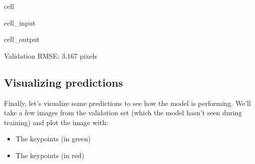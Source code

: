\documentclass[letterpaper,10pt,english]{jupyterBook}
\begin{document}
\begin{sphinxuseclass}{cell}
\begin{sphinxVerbatimInput}
\begin{sphinxuseclass}{cell_input}
\end{sphinxuseclass}\end{sphinxVerbatimInput}
\begin{sphinxVerbatimOutput}

\begin{sphinxuseclass}{cell_output}
\begin{sphinxVerbatim}[commandchars=\\\{\}]
Validation RMSE: 3.167 pixels
\end{sphinxVerbatim}

\end{sphinxuseclass}\end{sphinxVerbatimOutput}

\end{sphinxuseclass}

\subsection{Visualizing predictions}
\label{\detokenize{04:visualizing-predictions}}
\sphinxAtStartPar
Finally, let’s visualize some predictions to see how the model is performing. We’ll take a few images from the validation set (which the model hasn’t seen during training) and plot the image with:
\begin{itemize}
\item {} 
\sphinxAtStartPar
The  keypoints (in green)

\item {} 
\sphinxAtStartPar
The  keypoints (in red)

\end{itemize}
\end{document}
